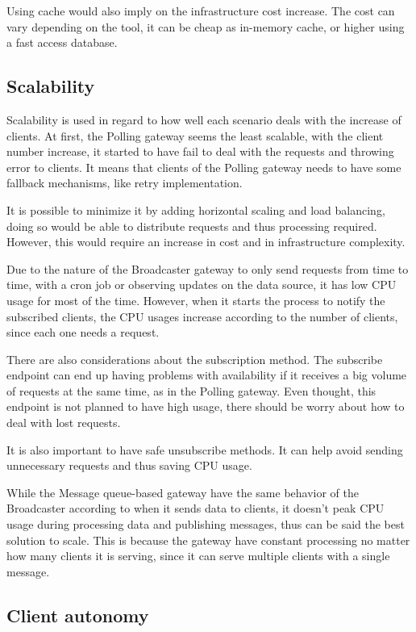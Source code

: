 Using cache would also imply on the infrastructure cost increase. The cost can vary depending on the tool, it can be cheap as in-memory cache, or higher using a fast access database.

\subsection*{Scalability}
\label{sec:scala}

Scalability is used in regard to how well each scenario deals with the increase of clients. At first, the Polling gateway seems the least scalable, with the client number increase, it started to have fail to deal with the requests and throwing error to clients. It means that clients of the Polling gateway needs to have some fallback mechanisms, like retry implementation.

It is possible to minimize it by adding horizontal scaling and load balancing, doing so would be able to distribute requests and thus processing required. However, this would require an increase in cost and in infrastructure complexity.

Due to the nature of the Broadcaster gateway to only send requests from time to time, with a cron job or observing updates on the data source, it has low CPU usage for most of the time. However, when it starts the process to notify the subscribed clients, the CPU usages increase according to the number of clients, since each one needs a request.

There are also considerations about the subscription method. The subscribe endpoint can end up having  problems with availability if it receives a big volume of requests at the same time, as in the Polling gateway. Even thought, this endpoint is not planned to have high usage, there should be worry about how to deal with lost requests.

It is also important to have safe unsubscribe methods. It can help avoid sending unnecessary requests and thus saving CPU usage.

While the Message queue-based gateway have the same behavior of the Broadcaster according to when it sends data to clients, it doesn't peak CPU usage during processing data and publishing messages, thus can be said the best solution to scale. This is because the gateway have constant processing no matter how many clients it is serving, since it can serve multiple clients with a single message.

\subsection*{Client autonomy}
\label{sec:client}

